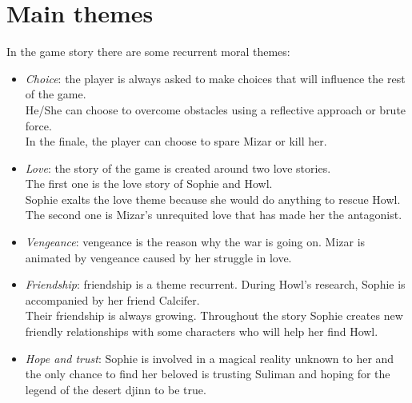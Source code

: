 \section{Main themes}

In the game story there are some recurrent moral themes:

\begin{itemize}
\item \textit{Choice}: the player is always asked to make choices that will influence the rest of the game. \\
  He/She can choose to overcome obstacles using a reflective approach or brute force. \\
  In the finale, the player can choose to spare Mizar or kill her.

\item \textit{Love}: the story of the game is created around two love stories. \\
  The first one is the love story of Sophie and Howl. \\
  Sophie exalts the love theme because she would do anything to rescue Howl. \\
  The second one is Mizar’s unrequited love that has made her the antagonist.

\item \textit{Vengeance}: vengeance is the reason why the war is going on. Mizar is animated by vengeance caused by her struggle in love.


\item \textit{Friendship}: friendship is a theme recurrent. During Howl's research, Sophie is accompanied by her friend Calcifer. \\
  Their friendship is always growing. Throughout the story Sophie creates new friendly relationships with some characters who will help her find Howl.

\item \textit{Hope and trust}: Sophie is involved in a magical reality unknown to her and the only chance to find her beloved is trusting Suliman and hoping for the legend of the desert djinn  to be true.

\end{itemize}
